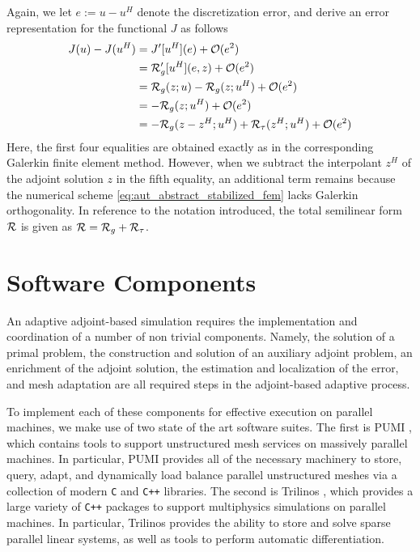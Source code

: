 Again, we let $e := u - u^H$ denote the discretization error, and derive
an error representation for the functional $J$ as follows
%
\begin{gather}
\begin{aligned}
J(u) - J(u^H) &= J'[u^H](e) + \mathcal{O}(e^2) \\
&= \mathcal{R}_g'[u^H](e, z) + \mathcal{O}(e^2) \\
&= \mathcal{R}_g(z; u) - \mathcal{R}_g(z; u^H) + \mathcal{O}(e^2) \\
&= - \mathcal{R}_g(z; u^H) + \mathcal{O}(e^2) \\
&= - \mathcal{R}_g(z - z^H; u^H) + \mathcal{R}_{\tau}(z^H; u^H) + \mathcal{O}(e^2)
\end{aligned}
\label{eq:aut_abstract_stabilized_error}
\end{gather}
%
Here, the first four equalities are obtained exactly as in the corresponding
Galerkin finite element method. However, when we subtract the interpolant
$z^H$ of the adjoint solution $z$ in the fifth equality, an additional term
remains because the numerical scheme \eqref{eq:aut_abstract_stabilized_fem}
lacks Galerkin orthogonality. In reference to the notation
introduced, the total semilinear form $\mathcal{R}$ is given as
$\mathcal{R} = \mathcal{R}_g + \mathcal{R}_{\tau}$.

\section{Software Components}

An adaptive adjoint-based simulation
requires the implementation and coordination of a number of
non trivial components. Namely, the solution of a primal problem,
the construction and solution of an auxiliary adjoint problem, an enrichment
of the adjoint solution, the estimation and localization of the error,
and mesh adaptation are all required steps in the adjoint-based
adaptive process.

To implement each of these components for effective execution on parallel
machines, we make use of two state of the art software suites. The first
is PUMI \cite{ibanez2016pumi}, which contains tools to
support unstructured mesh services on massively parallel machines. In
particular, PUMI provides all of the necessary machinery to store, query,
adapt, and dynamically load balance parallel unstructured meshes via
a collection of modern \texttt{C} and \texttt{C++} libraries. The second
is Trilinos \cite{heroux2005overview, heroux2012new}, which provides a
large variety of \texttt{C++} packages to support multiphysics
simulations on parallel machines. In particular, Trilinos provides
the ability to store and solve sparse parallel linear systems, as
well as tools to perform automatic differentiation.

